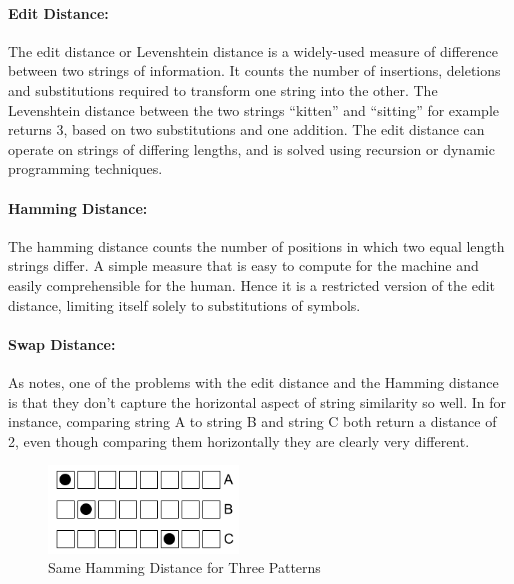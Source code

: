 \paragraph{Edit Distance:} The edit distance or Levenshtein distance is a widely-used measure of difference between two strings of information. It counts the number of insertions, deletions and substitutions required to transform one string into the other. The  Levenshtein distance between the two strings “kitten” and “sitting” for example returns 3, based on two substitutions and one addition. The edit distance can operate on strings of differing lengths, and is solved using recursion or dynamic programming techniques.

\paragraph{Hamming Distance:} The hamming distance counts the number of positions in which two equal length strings differ. A simple measure that is easy to compute for the machine and easily comprehensible for the human. Hence it is a restricted version of the edit distance, limiting itself solely to substitutions of symbols.

\paragraph{Swap Distance:} As \cite{Toussaint2013} notes, one of the problems with the edit distance and the Hamming distance is that they don’t capture the horizontal aspect of string similarity so well. In  for instance, comparing string A to string B and string C both return a distance of 2, even though comparing them horizontally they are clearly very different.

\begin{figure}
	\begin{center}
		\includegraphics[width=0.45\textwidth]{ch03_symbolic/figures/hamming_comparison.png}
	\end{center}
	\caption[Hamming Distance Comparison]{Same Hamming Distance for Three Patterns}
	\label{fig:hamming_comparison}
\end{figure}

